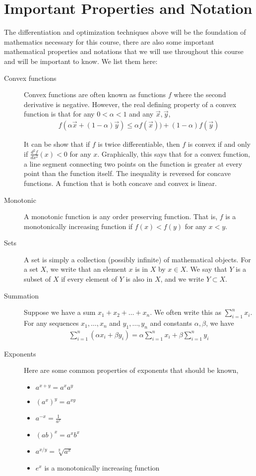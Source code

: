 

\section{Important Properties and Notation}
The differentiation and optimization techniques above will be the foundation of mathematics necessary for this course, there are also some important mathematical properties and notations that we will use throughout this course and will be important to know. We list them here:
\begin{description}
    \item[Convex functions] Convex functions are often known as functions $f$ where the second derivative is negative. However, the real defining property of a convex function is that for any $0 < \alpha < 1$ and any $\vec{x}, \vec{y}$,
    \begin{align*}
        f(\alpha \vec{x} + (1 - \alpha) \vec{y}) \leq \alpha f(\vec{x})) + (1 - \alpha) f(\vec{y})
    \end{align*} 
    
    It can be show that if $f$ is twice differentiable, then $f$ is convex if and only if $\frac{d^2f}{dx^2}(x) < 0$ for any $x$. Graphically, this says that for a convex function, a line segment connecting two points on the function is greater at every point than the function itself. The inequality is reversed for concave functions. A function that is both concave and convex is linear.
    \item[Monotonic] A monotonic function is any order preserving function. That is, $f$ is a monotonically increasing function if $f(x) < f(y)$ for any $x < y$. 
    \item[Sets] A set is simply a collection (possibly infinite) of mathematical objects. For a set $X$, we write that an element $x$ is in $X$ by $x \in X$. We say that $Y$ is a subset of $X$ if every element of $Y$ is also in $X$, and we write $Y \subset X$.  
    \item[Summation] Suppose we have a sum $x_1 + x_2 + \dots + x_n$. We often write this as $\sum_{i = 1}^n x_i$. For any sequences $x_1, \dots, x_n$ and $y_1, \dots, y_n$ and constants $\alpha, \beta$, we have
    \begin{align*}
        \sum_{i = 1}^n (\alpha x_i + \beta y_i) = \alpha \sum_{i = 1}^n x_i + \beta \sum_{i = 1}^n y_i
    \end{align*} 
    \item[Exponents] Here are some common properties of exponents that should be known,
    \begin{itemize}
        \item $a^{x + y} = a^x a^y$
        \item $(a^x)^y = a^{xy}$
        \item $a^{-x} = \frac{1}{a^{x}}$
        \item $(ab)^x = a^x b^x$
        \item $a^{x/y} = \sqrt[y]{a^x}$
        \item $e^x$ is a monotonically increasing function
    \end{itemize}
    

\end{description}

